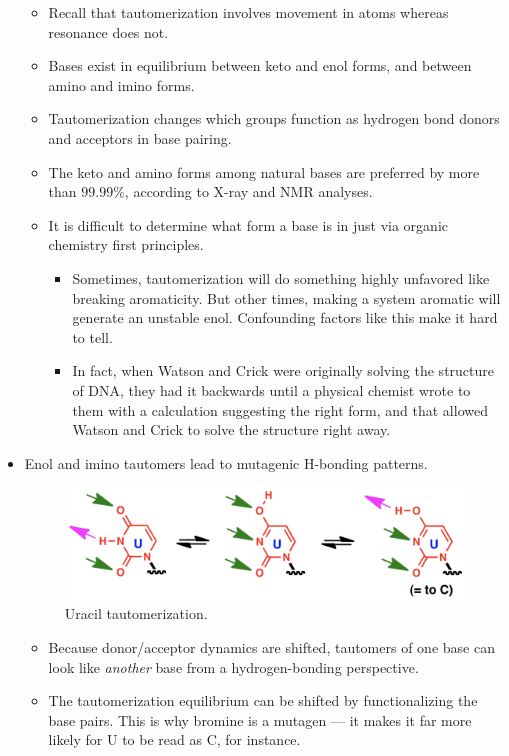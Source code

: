 \documentclass[../notes.tex]{subfiles}
\begin{document}
\begin{itemize}
\begin{figure}[h!]
    \end{figure}
    \begin{itemize}
        \item Recall that tautomerization involves movement in atoms whereas resonance does not.
        \item Bases exist in equilibrium between keto and enol forms, and between amino and imino forms.
        \item Tautomerization changes which groups function as hydrogen bond donors and acceptors in base pairing.
        \item The keto and amino forms among natural bases are preferred by more than $99.99\%$, according to X-ray and NMR analyses.
        \item It is difficult to determine what form a base is in just via organic chemistry first principles.
        \begin{itemize}
            \item Sometimes, tautomerization will do something highly unfavored like breaking aromaticity. But other times, making a system aromatic will generate an unstable enol. Confounding factors like this make it hard to tell.
            \item In fact, when Watson and Crick were originally solving the structure of DNA, they had it backwards until a physical chemist wrote to them with a calculation suggesting the right form, and that allowed Watson and Crick to solve the structure right away.
        \end{itemize}
    \end{itemize}
    \item Enol and imino tautomers lead to mutagenic H-bonding patterns.
    \begin{figure}[H]
        \centering
        \includegraphics[width=0.6\linewidth]{../ExtFiles/uracilTautomerization.png}
        \caption{Uracil tautomerization.}
        \label{fig:uracilTautomerization}
    \end{figure}
    \begin{itemize}
        \item Because donor/acceptor dynamics are shifted, tautomers of one base can look like \emph{another} base from a hydrogen-bonding perspective.
        \item The tautomerization equilibrium can be shifted by functionalizing the base pairs. This is why bromine is a mutagen --- it makes it far more likely for U to be read as C, for instance.

\end{itemize}
\end{itemize}
\end{document}
